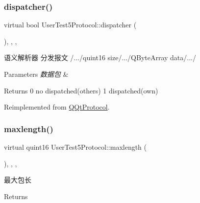 \subsubsection{\texorpdfstring{dispatcher()}{dispatcher()}}
{\footnotesize\ttfamily virtual bool User\+Test5\+Protocol\+::dispatcher (\begin{DoxyParamCaption}\item[{const Q\+Byte\+Array \&}]{ }\end{DoxyParamCaption})\hspace{0.3cm}{\ttfamily [inline]}, {\ttfamily [override]}, {\ttfamily [protected]}, {\ttfamily [virtual]}}



语义解析器 分发报文 /.../quint16 size/.../\+Q\+Byte\+Array data/.../ 


\begin{DoxyParams}{Parameters}
{\em 数据包} & \\
\hline
\end{DoxyParams}
\begin{DoxyReturn}{Returns}
0 no dispatched(others) 1 dispatched(own) 
\end{DoxyReturn}


Reimplemented from \mbox{\hyperlink{class_q_qt_protocol_a35a69c4b89c8cf7459038f40d75e0dc9}{Q\+Qt\+Protocol}}.

\mbox{\label{class_user_test5_protocol_a70e5c3d6fea36a9b85ac260d1642880e}} 
\subsubsection{\texorpdfstring{maxlength()}{maxlength()}}
{\footnotesize\ttfamily virtual quint16 User\+Test5\+Protocol\+::maxlength (\begin{DoxyParamCaption}{ }\end{DoxyParamCaption})\hspace{0.3cm}{\ttfamily [inline]}, {\ttfamily [override]}, {\ttfamily [protected]}, {\ttfamily [virtual]}}



最大包长 

\begin{DoxyReturn}{Returns}

\end{DoxyReturn}


